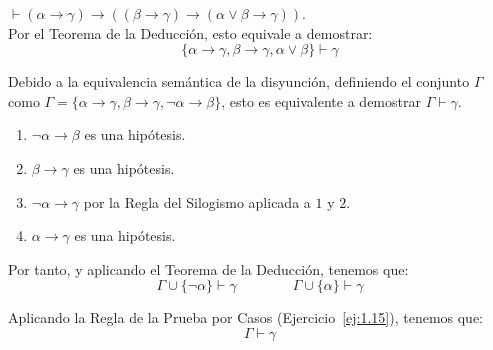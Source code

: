 \begin{ejercicio}\label{ej:1.24}
    $\vdash (\alpha \rightarrow \gamma) \rightarrow ((\beta \rightarrow \gamma) \rightarrow (\alpha \lor \beta \rightarrow \gamma))$.\\

    Por el Teorema de la Deducción, esto equivale a demostrar:
    \begin{equation*}
        \{\alpha\rightarrow\gamma,\beta\rightarrow\gamma,\alpha\lor\beta\} \vdash \gamma
    \end{equation*}

    Debido a la equivalencia semántica de la disyunción, definiendo el conjunto $\Gamma$ como $\Gamma=\{\alpha\rightarrow\gamma,\beta\rightarrow\gamma,\neg\alpha\rightarrow \beta\}$,    
    esto es equivalente a demostrar $\Gamma \vdash \gamma$.
    \begin{enumerate}[label=\arabic*.]
        \item $\neg\alpha\rightarrow \beta$ es una hipótesis.
        \item $\beta\rightarrow\gamma$ es una hipótesis.
        \item $\neg\alpha\rightarrow\gamma$ por la Regla del Silogismo aplicada a $1$ y $2$.
        \item $\alpha\rightarrow\gamma$ es una hipótesis.
   \end{enumerate}

    Por tanto, y aplicando el Teorema de la Deducción, tenemos que:
    \begin{equation*}
        \Gamma \cup \{\neg\alpha\} \vdash \gamma\qquad\qquad \Gamma \cup \{\alpha\} \vdash \gamma
    \end{equation*}

    Aplicando la Regla de la Prueba por Casos (Ejercicio~\ref{ej:1.15}), tenemos que:
    \begin{equation*}
        \Gamma \vdash \gamma
    \end{equation*}
\end{ejercicio}

